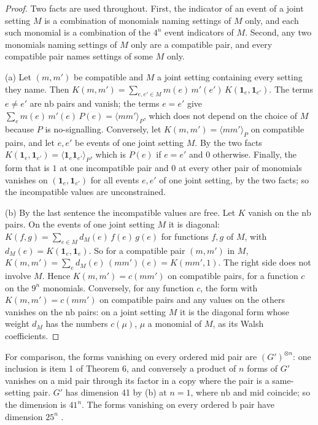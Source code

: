 \documentclass[11pt,a4paper]{article}
\theoremstyle{definition}
\theoremstyle{remark}
\newcommand{\ind}[1]{\mathbf{1}_{#1}}
\newcommand{\nb}{\mathrm{nb}}
\newcommand{\md}{\mathrm{mid}}
\newcommand{\br}{\mathrm{b}}
\begin{document}
\begin{proof}
Two facts are used throughout. First, the indicator of an event of a joint setting $M$ is a combination of monomials naming settings of $M$ only, and each such monomial is a combination of the $4^n$ event indicators of $M$. Second, any two monomials naming settings of $M$ only are a compatible pair, and every compatible pair names settings of some $M$ only.

(a) Let $(m, m')$ be compatible and $M$ a joint setting containing every setting they name. Then $K(m, m') = \sum_{e, e' \in M} m(e)\, m'(e')\, K(\ind{e}, \ind{e'})$. The terms $e \neq e'$ are $\nb$ pairs and vanish; the terms $e = e'$ give $\sum_e m(e)\, m'(e)\, P(e) = \langle m m' \rangle_P$, which does not depend on the choice of $M$ because $P$ is no-signalling. Conversely, let $K(m, m') = \langle m m' \rangle_P$ on compatible pairs, and let $e, e'$ be events of one joint setting $M$. By the two facts $K(\ind{e}, \ind{e'}) = \langle \ind{e} \ind{e'} \rangle_P$, which is $P(e)$ if $e = e'$ and $0$ otherwise. Finally, the form that is $1$ at one incompatible pair and $0$ at every other pair of monomials vanishes on $(\ind{e}, \ind{e'})$ for all events $e, e'$ of one joint setting, by the two facts; so the incompatible values are unconstrained.

(b) By the last sentence the incompatible values are free. Let $K$ vanish on the $\nb$ pairs. On the events of one joint setting $M$ it is diagonal: $K(f, g) = \sum_{e \in M} d_M(e)\, f(e)\, g(e)$ for functions $f, g$ of $M$, with $d_M(e) = K(\ind{e}, \ind{e})$. So for a compatible pair $(m, m')$ in $M$, $K(m, m') = \sum_e d_M(e)\, (m m')(e) = K(m m', 1)$. The right side does not involve $M$. Hence $K(m, m') = c(m m')$ on compatible pairs, for a function $c$ on the $9^n$ monomials. Conversely, for any function $c$, the form with $K(m, m') = c(m m')$ on compatible pairs and any values on the others vanishes on the $\nb$ pairs: on a joint setting $M$ it is the diagonal form whose weight $d_M$ has the numbers $c(\mu)$, $\mu$ a monomial of $M$, as its Walsh coefficients.
\end{proof}

For comparison, the forms vanishing on every ordered $\md$ pair are $(G')^{\otimes n}$: one inclusion is item 1 of Theorem 6, and conversely a product of $n$ forms of $G'$ vanishes on a $\md$ pair through its factor in a copy where the pair is a same-setting pair. $G'$ has dimension 41 by (b) at $n = 1$, where $\nb$ and $\md$ coincide; so the dimension is $41^n$. The forms vanishing on every ordered $\br$ pair have dimension $25^n$ \cite{R7}.
\end{document}
